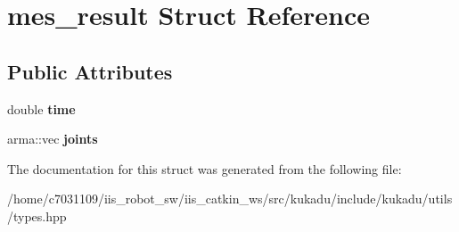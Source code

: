 \hypertarget{structmes__result}{\section{mes\-\_\-result Struct Reference}
\label{structmes__result}
}
\subsection*{Public Attributes}
\begin{DoxyCompactItemize}
\item 
\hypertarget{structmes__result_aba1b7f652e4abfa3f4bd73f735e893a6}{double {\bfseries time}}\label{structmes__result_aba1b7f652e4abfa3f4bd73f735e893a6}

\item 
\hypertarget{structmes__result_a8b2d0bedd83bd814cd5f5810f40e5340}{arma\-::vec {\bfseries joints}}\label{structmes__result_a8b2d0bedd83bd814cd5f5810f40e5340}

\end{DoxyCompactItemize}


The documentation for this struct was generated from the following file\-:\begin{DoxyCompactItemize}
\item 
/home/c7031109/iis\-\_\-robot\-\_\-sw/iis\-\_\-catkin\-\_\-ws/src/kukadu/include/kukadu/utils/types.\-hpp\end{DoxyCompactItemize}
